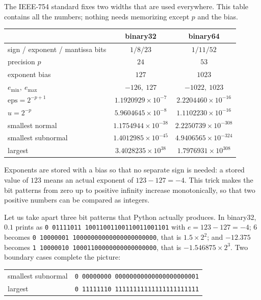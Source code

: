 The IEEE-754 standard fixes two widths that are used everywhere. This table contains all
the numbers; nothing needs memorizing except $p$ and the bias.

\begin{center}
\begin{tabular}{lcc}
\hline
 & binary32 & binary64 \\
\hline
sign / exponent / mantissa bits & $1/8/23$ & $1/11/52$ \\
precision $p$ & $24$ & $53$ \\
exponent bias & $127$ & $1023$ \\
$e_{\min},\ e_{\max}$ & $-126,\ 127$ & $-1022,\ 1023$ \\
$\mathrm{eps}=2^{-p+1}$ & $1.1920929\times10^{-7}$ & $2.2204460\times10^{-16}$ \\
$u=2^{-p}$ & $5.9604645\times10^{-8}$ & $1.1102230\times10^{-16}$ \\
smallest normal & $1.1754944\times10^{-38}$ & $2.2250739\times10^{-308}$ \\
smallest subnormal & $1.4012985\times10^{-45}$ & $4.9406565\times10^{-324}$ \\
largest & $3.4028235\times10^{38}$ & $1.7976931\times10^{308}$ \\
\hline
\end{tabular}
\end{center}

Exponents are stored with a bias so that no separate sign is needed: a stored value of
$123$ means an actual exponent of $123-127=-4$. This trick makes the bit patterns from
zero up to positive infinity increase monotonically, so that two positive numbers can be
compared as integers.

Let us take apart three bit patterns that Python actually produces. In binary32,
$0.1$ prints as \texttt{0 01111011 10011001100110011001101} with
$e=123-127=-4$; $6$ becomes \texttt{0 10000001 10000000000000000000000}, that is
$1.5\times2^{2}$; and $-12.375$ becomes
\texttt{1 10000010 10001100000000000000000}, that is $-1.546875\times2^{3}$.
Two boundary cases complete the picture:

\begin{center}
\begin{tabular}{ll}
\hline
smallest subnormal & \texttt{0 00000000 00000000000000000000001} \\
largest & \texttt{0 11111110 11111111111111111111111} \\
\hline
\end{tabular}
\end{center}

